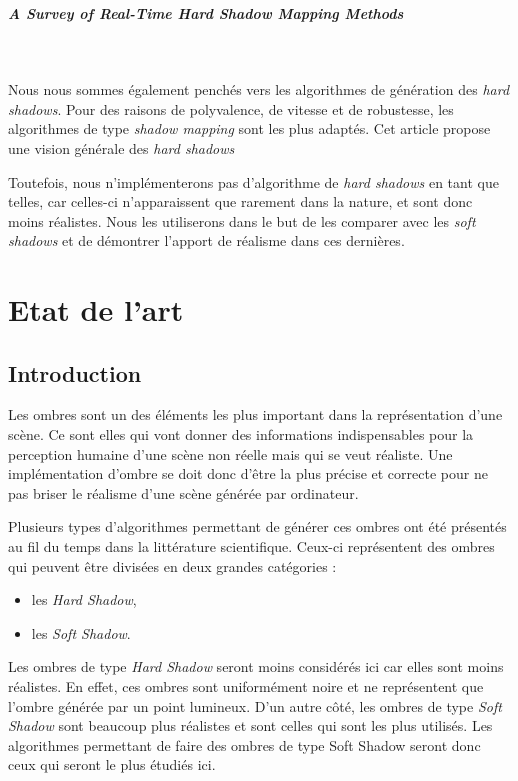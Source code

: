 \documentclass[a4paper,10pt]{report}
\begin{document}
\paragraph{\large A Survey of Real-Time Hard Shadow Mapping Methods}
~~\\
\cite{scherzer2011survey}

Nous nous sommes également penchés vers les algorithmes de génération des \textit{hard shadows}. Pour des raisons de polyvalence, de vitesse et de robustesse, les algorithmes de type \textit{shadow mapping} sont les plus adaptés. Cet article propose une vision générale des \textit{hard shadows}

Toutefois, nous n'implémenterons pas d'algorithme de \textit{hard shadows} en tant que telles, car celles-ci n'apparaissent que rarement dans la nature, et sont donc moins réalistes. Nous les utiliserons dans le but de les comparer avec les \textit{soft shadows} et de démontrer l'apport de réalisme dans ces dernières.

\chapter{Etat de l'art}

\section{Introduction}

Les ombres sont un des éléments les plus important dans la représentation d'une scène. Ce sont elles qui vont donner des informations indispensables pour la perception humaine d'une scène non réelle mais qui se veut réaliste. Une implémentation d'ombre se doit donc d'être la plus précise et correcte pour ne pas briser le réalisme d'une scène générée par ordinateur.

Plusieurs types d'algorithmes permettant de générer ces ombres ont été présentés au fil du temps dans la littérature scientifique. Ceux-ci représentent des ombres qui peuvent être divisées en deux grandes catégories : 
\begin{itemize}
\item les \textit{Hard Shadow},
\item les \textit{Soft Shadow}.
\end{itemize}
Les ombres de type \textit{Hard Shadow} seront moins considérés ici car elles sont moins réalistes. En effet, ces ombres sont uniformément noire et ne représentent que l'ombre générée par un point lumineux. D'un autre côté, les ombres de type \textit{Soft Shadow} sont beaucoup plus réalistes et sont celles qui sont les plus utilisés. Les algorithmes permettant de faire des ombres de type Soft Shadow seront donc ceux qui seront le plus étudiés ici.
\end{document}
